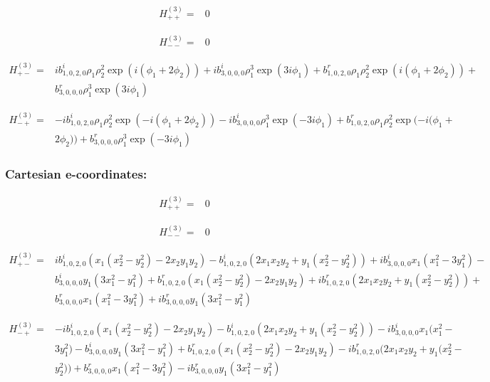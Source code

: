 \documentclass[fleqn]{article}
\begin{document}
\begin{align*}
H_{++}^{(3)}=&0
\end{align*}

\begin{align*}
H_{--}^{(3)}=&0
\end{align*}

\begin{align*}
H_{+-}^{(3)}=&i b^{i}_{1,0,2,0} \rho_{1} \rho_{2}^{2} \exp (i (\phi_{1} + 2 \phi_{2})) + i b^{i}_{3,0,0,0} \rho_{1}^{3} \exp (3 i \phi_{1}) + b^{r}_{1,0,2,0} \rho_{1} \rho_{2}^{2} \exp (i (\phi_{1} + 2 \phi_{2})) +\\
& b^{r}_{3,0,0,0} \rho_{1}^{3} \exp (3 i \phi_{1})
\end{align*}

\begin{align*}
H_{-+}^{(3)}=&- i b^{i}_{1,0,2,0} \rho_{1} \rho_{2}^{2} \exp (- i (\phi_{1} + 2 \phi_{2})) - i b^{i}_{3,0,0,0} \rho_{1}^{3} \exp (- 3 i \phi_{1}) + b^{r}_{1,0,2,0} \rho_{1} \rho_{2}^{2} \exp (- i (\phi_{1} +\\
& 2 \phi_{2})) + b^{r}_{3,0,0,0} \rho_{1}^{3} \exp (- 3 i \phi_{1})
\end{align*}
\subsubsection*{Cartesian e-coordinates:}

\begin{align*}
H_{++}^{(3)}=&0
\end{align*}

\begin{align*}
H_{--}^{(3)}=&0
\end{align*}

\begin{align*}
H_{+-}^{(3)}=& i b^{i}_{1,0,2,0} (x_{1} (x_{2}^{2} - y_{2}^{2}) - 2 x_{2} y_{1} y_{2}) - b^{i}_{1,0,2,0} (2 x_{1} x_{2} y_{2} + y_{1} (x_{2}^{2} - y_{2}^{2})) +  i b^{i}_{3,0,0,0} x_{1} (x_{1}^{2} - 3 y_{1}^{2}) -\\
& b^{i}_{3,0,0,0} y_{1} (3 x_{1}^{2} - y_{1}^{2}) + b^{r}_{1,0,2,0} (x_{1} (x_{2}^{2} - y_{2}^{2}) - 2 x_{2} y_{1} y_{2}) +  i b^{r}_{1,0,2,0} (2 x_{1} x_{2} y_{2} + y_{1} (x_{2}^{2} - y_{2}^{2})) +\\
& b^{r}_{3,0,0,0} x_{1} (x_{1}^{2} - 3 y_{1}^{2}) +  i b^{r}_{3,0,0,0} y_{1} (3 x_{1}^{2} - y_{1}^{2})
\end{align*}

\begin{align*}
H_{-+}^{(3)}=&-  i b^{i}_{1,0,2,0} (x_{1} (x_{2}^{2} - y_{2}^{2}) - 2 x_{2} y_{1} y_{2}) - b^{i}_{1,0,2,0} (2 x_{1} x_{2} y_{2} + y_{1} (x_{2}^{2} - y_{2}^{2})) -  i b^{i}_{3,0,0,0} x_{1} (x_{1}^{2} -\\
& 3 y_{1}^{2}) - b^{i}_{3,0,0,0} y_{1} (3 x_{1}^{2} - y_{1}^{2}) + b^{r}_{1,0,2,0} (x_{1} (x_{2}^{2} - y_{2}^{2}) - 2 x_{2} y_{1} y_{2}) -  i b^{r}_{1,0,2,0} (2 x_{1} x_{2} y_{2} + y_{1} (x_{2}^{2} -\\
& y_{2}^{2})) + b^{r}_{3,0,0,0} x_{1} (x_{1}^{2} - 3 y_{1}^{2}) -  i b^{r}_{3,0,0,0} y_{1} (3 x_{1}^{2} - y_{1}^{2})
\end{align*}
\end{document}
